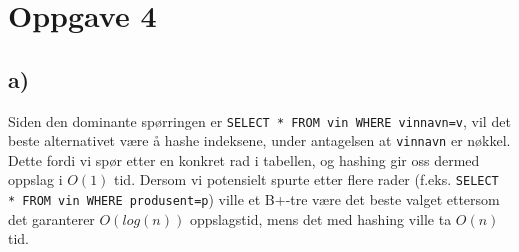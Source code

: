 \section{Oppgave 4}

\subsection{a)}

Siden den dominante spørringen er \texttt{SELECT * FROM vin WHERE vinnavn=v}, vil det beste alternativet være å hashe indeksene, under antagelsen at \texttt{vinnavn} er nøkkel. Dette fordi vi spør etter en konkret rad i tabellen, og hashing gir oss dermed oppslag i $O(1)$ tid. Dersom vi potensielt spurte etter flere rader (f.eks. \texttt{SELECT * FROM vin WHERE produsent=p}) ville et B+-tre være det beste valget ettersom det garanterer $O(log(n))$ oppslagstid, mens det med hashing ville ta $O(n)$ tid.
